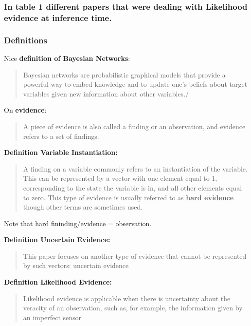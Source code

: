 \documentclass[a4paper]{article}
\begin{document}
\subsubsection{In table 1 different papers that were dealing with Likelihood evidence at inference time.}
\label{sec:orgab35411}


\subsubsection{Definitions}
\label{sec:org0641c15}

Nice \textbf{definition of Bayesian Networks}:

\begin{quote}
Bayesian networks are probabilistic graphical models that provide a
powerful way to embed knowledge and to update one’s beliefs about
target variables given new information about other variables./
\end{quote}

On \textbf{evidence}:

\begin{quote}
A piece of evidence is also called a finding or an observation, and
evidence refers to a set of findings.
\end{quote}

\textbf{Definition Variable Instantiation:}

\begin{quote}
A finding on a variable commonly refers to an instantiation of the
variable.  This can be represented by a vector with one element
equal to 1, corresponding to the state the variable is in, and all
other elements equal to zero. This type of evidence is usually
referred to as \textbf{hard evidence} though other terms are sometimes used.
\end{quote}

Note that hard fininding/evidence = observation.

\textbf{Definition Uncertain Evidence:}

\begin{quote}
This paper focuses on another type of evidence that cannot be
represented by such vectors: uncertain evidence
\end{quote}


\textbf{Definition Likelihood Evidence:}

\begin{quote}
Likelihood evidence is applicable when there is uncertainty about the
veracity of an observation, such as, for example, the information
given by an imperfect sensor
\end{quote}
\end{document}
